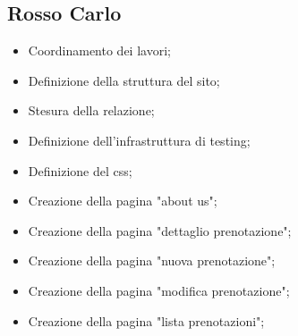 \subsection{Rosso Carlo}
\begin{itemize}
	\item Coordinamento dei lavori;
	\item Definizione della struttura del sito;
	\item Stesura della relazione;
	\item Definizione dell'infrastruttura di testing;
	\item Definizione del css;
	\item Creazione della pagina "about us";
	\item Creazione della pagina "dettaglio prenotazione";
	\item Creazione della pagina "nuova prenotazione";
	\item Creazione della pagina "modifica prenotazione";
	\item Creazione della pagina "lista prenotazioni";
\end{itemize}
